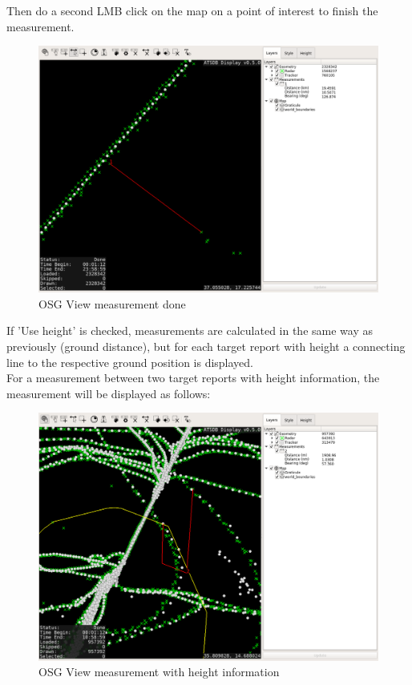 Then do a second LMB click on the map on a point of interest to finish the measurement.

\begin{figure}[H]
    \hspace*{-2.5cm}
    \includegraphics[width=19cm,frame]{../screenshots/osgview_measure2.png}
  \caption{OSG View measurement done}
\end{figure}

If 'Use height' is checked, measurements are calculated in the same way as previously (ground distance), but for each target report with height a connecting line to the respective ground position is displayed. \\

For a measurement between two target reports with height information, the measurement will be displayed as follows:

\begin{figure}[H]
    \hspace*{-2.5cm}
    \includegraphics[width=19cm,frame]{../screenshots/osgview_measure3d.png}
  \caption{OSG View measurement with height information}
\end{figure}

